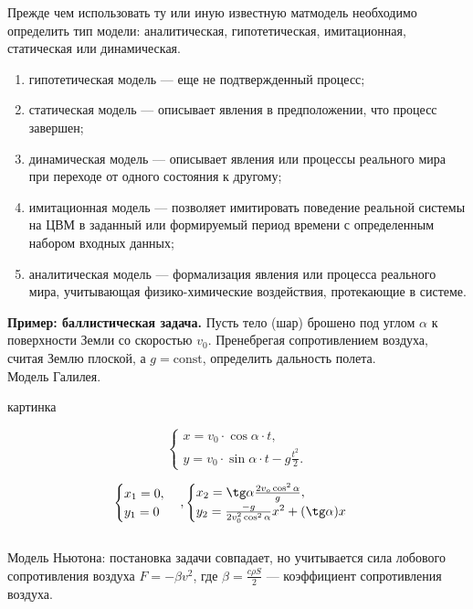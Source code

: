 \documentclass[12pt]{article}
\begin{document}
Прежде чем использовать ту или иную известную матмодель необходимо определить тип модели: аналитическая, гипотетическая, имитационная, статическая или динамическая.

\begin{enumerate}
    \item гипотетическая модель --- еще не подтвержденный процесс;
    \item статическая модель --- описывает явления в предположении, что процесс завершен;
    \item динамическая модель --- описывает явления или процессы реального мира при переходе от одного состояния к другому;
    \item имитационная модель --- позволяет имитировать поведение реальной системы на ЦВМ в заданный или формируемый период времени с определенным набором входных данных;
    \item аналитическая модель --- формализация явления или процесса реального мира, учитывающая физико-химические воздействия, протекающие в системе.
\end{enumerate}

\textbf{Пример: баллистическая задача.} Пусть тело (шар) брошено под углом $\alpha$ к поверхности Земли со скоростью $v_0$. Пренебрегая сопротивлением воздуха, считая Землю плоской, а $g = \mathrm{const}$, определить дальность полета.\\

Модель Галилея.

\begin{center}
    картинка
\end{center}

\[\begin{cases}
    x = v_0 \cdot \cos \alpha \cdot t,\\
    y = v_0 \cdot \sin \alpha \cdot t - g \frac{t^2}{2}.    
\end{cases}\]

\[\begin{cases}
    x_1 = 0,\\
    y_1 = 0
\end{cases},
\begin{cases}
    x_2 = \tg \alpha \frac{2 v_o \cos^2 \alpha}{g},\\
    y_2 = \frac{-g}{2 v_0^2 \cos^2 \alpha} x^2 + (\tg \alpha) x
\end{cases}
\]\\

Модель Ньютона: постановка задачи совпадает, но учитывается сила лобового сопротивления воздуха $F = -\beta v^2$, где $\beta = \frac{c \rho S}{2}$ --- коэффициент сопротивления воздуха.
\end{document}
